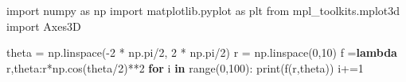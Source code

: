 \documentclass[11pt]{article}
\newenvironment{Shaded}{}{}
\newcommand{\KeywordTok}[1]{\textcolor[rgb]{0.00,0.44,0.13}{\textbf{{#1}}}}
\newcommand{\DecValTok}[1]{\textcolor[rgb]{0.25,0.63,0.44}{{#1}}}
\newcommand{\NormalTok}[1]{{#1}}
\newcommand{\ImportTok}[1]{{#1}}
\newcommand{\ControlFlowTok}[1]{\textcolor[rgb]{0.00,0.44,0.13}{\textbf{{#1}}}}
\newcommand{\OperatorTok}[1]{\textcolor[rgb]{0.40,0.40,0.40}{{#1}}}
\newcommand{\BuiltInTok}[1]{{#1}}
\begin{document}
\begin{Shaded}
\begin{Highlighting}[]

\ImportTok{import}\NormalTok{ numpy }\ImportTok{as}\NormalTok{ np}
\ImportTok{import}\NormalTok{ matplotlib.pyplot }\ImportTok{as}\NormalTok{ plt}
\ImportTok{from}\NormalTok{ mpl_toolkits.mplot3d }\ImportTok{import}\NormalTok{ Axes3D  }

\NormalTok{theta }\OperatorTok{=}\NormalTok{ np.linspace(}\OperatorTok{-}\DecValTok{2} \OperatorTok{*}\NormalTok{ np.pi}\OperatorTok{/}\DecValTok{2}\NormalTok{, }\DecValTok{2} \OperatorTok{*}\NormalTok{ np.pi}\OperatorTok{/}\DecValTok{2}\NormalTok{)}
\NormalTok{r }\OperatorTok{=}\NormalTok{ np.linspace(}\DecValTok{0}\NormalTok{,}\DecValTok{10}\NormalTok{)}
\NormalTok{f }\OperatorTok{=}\KeywordTok{lambda}\NormalTok{ r,theta:r}\OperatorTok{*}\NormalTok{np.cos(theta}\OperatorTok{/}\DecValTok{2}\NormalTok{)}\OperatorTok{**}\DecValTok{2}
\ControlFlowTok{for}\NormalTok{ i }\KeywordTok{in} \BuiltInTok{range}\NormalTok{(}\DecValTok{0}\NormalTok{,}\DecValTok{100}\NormalTok{):}
    \BuiltInTok{print}\NormalTok{(f(r,theta))}
\NormalTok{    i}\OperatorTok{+=}\DecValTok{1}
\end{Highlighting}
\end{Shaded}
\end{document}
